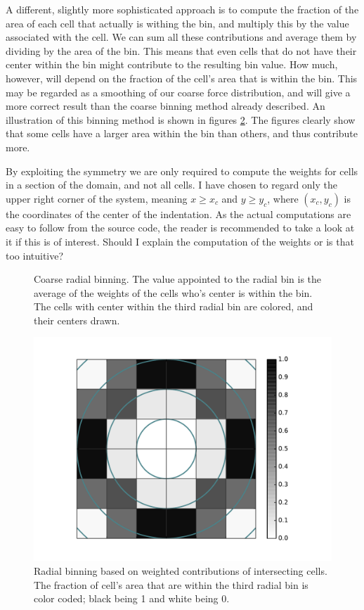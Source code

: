 \documentclass[twoside,english]{uiofysmaster}
\begin{document}
A different, slightly more sophisticated approach is to compute the fraction of the area of each cell that actually is withing the bin, and multiply this by the value associated with the cell.
We can sum all these contributions and average them by dividing by the area of the bin. 
This means that even cells that do not have their center within the bin might contribute to the resulting bin value. 
How much, however, will depend on the fraction of the cell's area that is within the bin.
This may be regarded as a smoothing of our coarse force distribution, and will give a more correct result than the coarse binning method already described. 
An illustration of this binning method is shown in figures \ref{fig:radialBinningWeights}.
The figures clearly show that some cells have a larger area within the bin than others, and thus contribute more. 


By exploiting the symmetry we are only required to compute the weights for cells in a section of the domain, and not all cells. 
I have chosen to regard only the upper right corner of the system, meaning $x\geq x_c$ and $y\geq y_c$, where $(x_c, y_c)$ is the coordinates of the center of the indentation.
As the actual computations are easy to follow from the source code, the reader is recommended to take a look at it if this is of interest. 
{\Large Should I explain the computation of the weights or is that too intuitive?}


\begin{figure}[H]
	\center
	\resizebox{0.48\linewidth}{!}{
		
	}
	\caption{Coarse radial binning. The value appointed to the radial bin is the average of the weights of the cells who's center is within the bin. The cells with center within the third radial bin are colored, and their centers drawn.}
	\label{fig:radialBinningChoars}
\end{figure}


\begin{figure}[H]
	\centering
	\hspace{0.87cm}
	\includegraphics[height=0.482\linewidth]{figures/forceDistribution/radialDistribution/weights.pdf}
	\caption{Radial binning based on weighted contributions of intersecting cells. The fraction of cell's area that are within the third radial bin is color coded; black being 1 and white being 0.}
	\label{fig:radialBinningWeights}
\end{figure}
\end{document}
